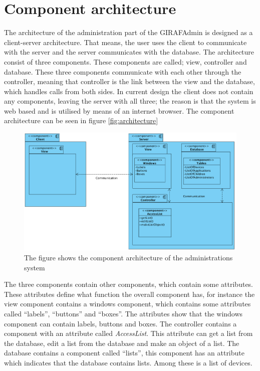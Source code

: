 \section{Component architecture}

The architecture of the administration part of the GIRAFAdmin is designed as a client-server architecture. That means, the user uses the client to communicate with the server and the server communicates with the database. The architecture consist of three components. These components are called; view, controller and database. These three components communicate with each other through the controller, meaning that controller is the link between the view and the database, which handles calls from both sides. In current design the client does not contain any components, leaving the server with all three; the reason is that the system is web based and is utilised by means of an internet browser. The component architecture can be seen in figure \vref{fig:architecture}

\begin{figure}[!ht]
\centering
\includegraphics[width=1.0\textwidth]{img/ComponentArketektur.png}
\caption{The figure shows the component architecture of the administrations system}
\label{fig:architecture}
\end{figure}

The three components contain other components, which contain some attributes. These attributes define what function the overall component has, for instance the view component contains a windows component, which contains some attributes called ``labels'', ``buttons'' and ``boxes''. The attributes show that the windows component can contain labels, buttons and boxes.
The controller contains a component with an attribute called \emph{AccessList}. This attribute can get a list from the database, edit a list from the database and make an object of a list.
The database contains a component called ``lists'', this component has an attribute which indicates that the database contains lists. Among these is a list of devices.